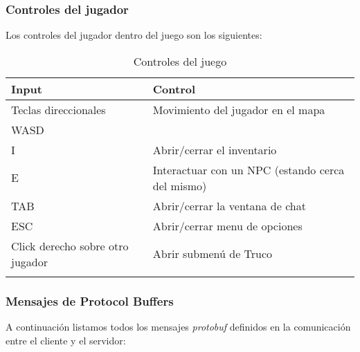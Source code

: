 
\subsubsection{Controles del jugador}

\noindent Los controles del jugador dentro del juego son los siguientes:

\begin{longtable}{|l|l|}
    \hline
    \textbf{Input} & \textbf{Control}\\
    \hline
    Teclas direccionales & Movimiento del jugador en el mapa \\
    WASD                 &  \\
    \hline
    I                    & Abrir/cerrar el inventario \\
    \hline
    E                    & Interactuar con un NPC (estando cerca del mismo) \\
    \hline
    TAB                  & Abrir/cerrar la ventana de chat \\
    \hline
    ESC                    & Abrir/cerrar menu de opciones \\
    \hline
    Click derecho sobre otro jugador & Abrir submenú de Truco \\
    \hline
    \caption{Controles del juego}\\
\end{longtable}

\subsubsection{Mensajes de Protocol Buffers}

\noindent A continuación listamos todos los mensajes \textit{protobuf} definidos
en la comunicación entre el cliente y el servidor:

